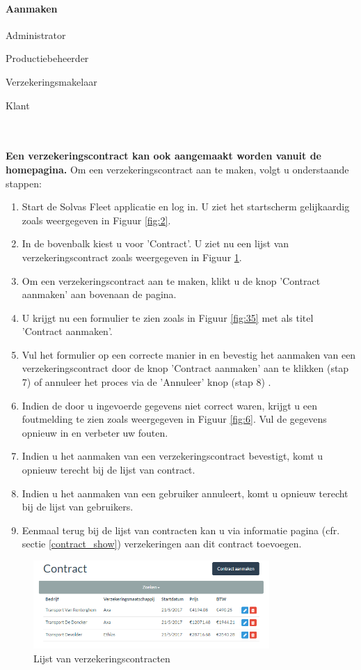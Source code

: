 \documentclass[11pt,openany]{article}
\newcommand{\cmark}{\ding{51}}%
\newcommand{\xmark}{\ding{55}}%
\newcommand{\done}{\rlap{$\square$}{\raisebox{2pt}{\large\hspace{1pt}\cmark}}%
	\hspace{-2.5pt}}
\newcommand{\wontfix}{\rlap{$\square$}{\large\hspace{1pt}\xmark}}
\begin{document}
\paragraph{Aanmaken}
\begin{todolist}
	\item[\done] Administrator
	\item[\done] Productiebeheerder
	\item[\done] Verzekeringsmakelaar
	\item[\wontfix] Klant 
\end{todolist}
\\
\\
\textbf{Een verzekeringscontract kan ook aangemaakt worden vanuit de homepagina.}
Om een verzekeringscontract aan te maken, volgt u onderstaande stappen:
\begin{enumerate}
	\item Start de Solvas Fleet applicatie en log in. U ziet het startscherm gelijkaardig zoals weergegeven in Figuur \ref{fig:2}.
	\item In de bovenbalk kiest u voor 'Contract'. U ziet nu een lijst van verzekeringscontract zoals weergegeven in Figuur \ref{fig:34}.
	\item Om een verzekeringscontract aan te maken, klikt u de knop 'Contract aanmaken' aan bovenaan de pagina.
	\item U krijgt nu een formulier te zien zoals	 in Figuur \ref{fig:35} met als titel 'Contract aanmaken'.
	\item Vul het formulier op een correcte manier in en bevestig het aanmaken van een verzekeringscontract door de knop 'Contract aanmaken' aan te klikken (stap 7) of annuleer het proces via de 'Annuleer' knop (stap 8) .
	\item Indien de door u ingevoerde gegevens niet correct waren, krijgt u een foutmelding te zien zoals weergegeven in Figuur \ref{fig:6}. Vul de gegevens opnieuw in en verbeter uw fouten.
	\item Indien u het aanmaken van een verzekeringscontract bevestigt, komt u opnieuw terecht bij de lijst van contract.
	\item Indien u het aanmaken van een gebruiker annuleert, komt u opnieuw terecht bij de lijst van gebruikers.
	\item Eenmaal terug bij de lijst van contracten kan u via informatie pagina (cfr. sectie \ref{contract_show}) verzekeringen aan dit contract toevoegen.
\end{enumerate}
\begin{figure}
	\centering
	\includegraphics[width=0.8\textwidth]{img/fig34.png}
	\caption{Lijst van verzekeringscontracten} 
	\label{fig:34} 
\end{figure}
\end{document}
